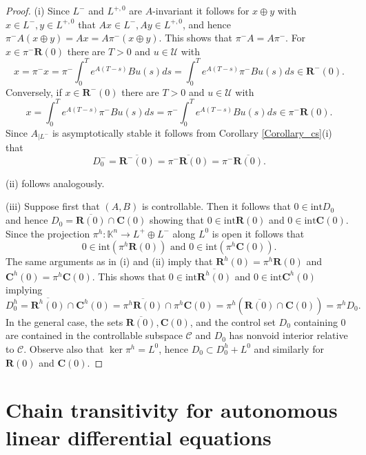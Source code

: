 \documentclass{siamltex}%
\begin{document}
\begin{proof}
(i) Since $L^{-}$ and $L^{+,0}$ are $A$-invariant it follows for $x\oplus y$
with $x\in L^{-},y\in L^{+,0}$ that $Ax\in L^{-},Ay\in L^{+,0}$, and hence
$\pi^{-}A(x\oplus y)=Ax=A\pi^{-}(x\oplus y)$. This shows that $\pi^{-}%
A=A\pi^{-}$. For $x\in\pi^{-}\mathbf{R}(0)$ there are $T>0$ and $u\in
\mathcal{U}$ with%
\[
x=\pi^{-}x=\pi^{-}\int_{0}^{T}e^{A(T-s)}Bu(s)ds=\int_{0}^{T}e^{A(T-s)}\pi
^{-}Bu(s)ds\in\mathbf{R}^{-}(0).
\]
Conversely, if $x\in\mathbf{R}^{-}(0)$ there are $T>0$ and $u\in\mathcal{U}$
with%
\[
x=\int_{0}^{T}e^{A(T-s)}\pi^{-}Bu(s)ds=\pi^{-}\int_{0}^{T}e^{A(T-s)}%
Bu(s)ds\in\pi^{-}\mathbf{R}(0).
\]
Since $A_{\left\vert L^{-}\right.  }$ is asymptotically stable it follows from
Corollary \ref{Corollary_cs}(i) that%
\[
D_{0}^{-}=\overline{\mathbf{R}^{-}(0)}=\overline{\pi^{-}\mathbf{R}(0)}=\pi
^{-}\overline{\mathbf{R}(0)}.
\]


(ii) follows analogously.

(iii) Suppose first that $(A,B)$ is controllable. Then it follows that
$0\in\mathrm{int}D_{0}$ and hence $D_{0}=\overline{\mathbf{R}(0)}%
\cap\mathbf{C}(0)$ showing that $0\in\mathrm{int}\mathbf{R}(0)$ and
$0\in\mathrm{int}\mathbf{C}(0)$. Since the projection $\pi^{h}:\mathbb{K}%
^{n}\rightarrow L^{+}\oplus L^{-}$ along $L^{0}$ is open it follows that%
\[
0\in\mathrm{int}\left(  \pi^{h}\mathbf{R}(0)\right)  \text{ and }%
0\in\mathrm{int}\left(  \pi^{h}\mathbf{C}(0)\right)  .
\]
The same arguments as in (i) and (ii) imply that $\mathbf{R}^{h}(0)=\pi
^{h}\mathbf{R}(0)$ and $\mathbf{C}^{h}(0)=\pi^{h}\mathbf{C}(0)$. This shows
that $0\in\mathrm{int}\overline{\mathbf{R}^{h}(0)}$ and $0\in\mathrm{int}%
\mathbf{C}^{h}(0)$ implying
\[
D_{0}^{h}=\overline{\mathbf{R}^{h}(0)}\cap\mathbf{C}^{h}(0)=\overline{\pi
^{h}\mathbf{R}(0)}\cap\pi^{h}\mathbf{C}(0)=\pi^{h}\left(  \overline
{\mathbf{R}(0)}\cap\mathbf{C}(0)\right)  =\pi^{h}D_{0}.
\]
In the general case, the sets $\overline{\mathbf{R}(0)},\mathbf{C}(0)$, and
the control set $D_{0}$ containing $0$ are contained in the controllable
subspace $\mathcal{C}$ and $D_{0}$ has nonvoid interior relative to
$\mathcal{C}$. Observe also that $\ker\pi^{h}=L^{0}$, hence $D_{0}\subset
D_{0}^{h}+L^{0}$ and similarly for $\mathbf{R}(0)$ and $\mathbf{C}(0)$.
\end{proof}

\section{Chain transitivity for autonomous linear differential
equations\label{Section3}}
\end{document}
